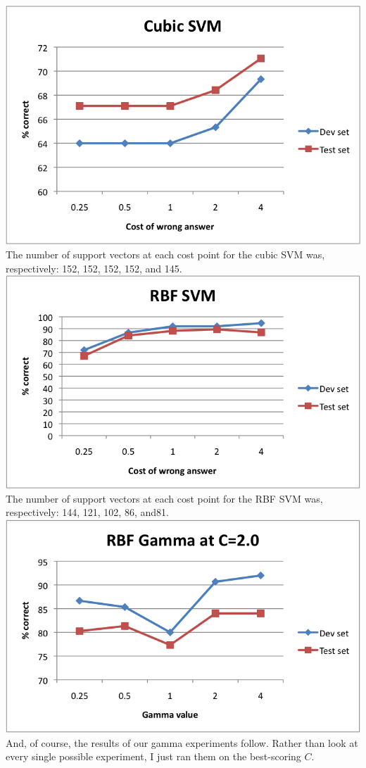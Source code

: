 \documentclass[fleqn]{article}
\begin{document}
\includegraphics[scale=0.75]{cubic.png} \\
The number of support vectors at each cost point for the cubic SVM was, respectively: 152, 152, 152, 152, and 145. \\

\includegraphics[scale=0.75]{rbf.png} \\
The number of support vectors at each cost point for the RBF SVM was, respectively: 144, 121, 102, 86, and81. \\

\includegraphics[scale=0.75]{gamma.png} \\
And, of course, the results of our gamma experiments follow. Rather than look at every single possible experiment, I just ran them on the best-scoring $C$. \\
\end{document}
